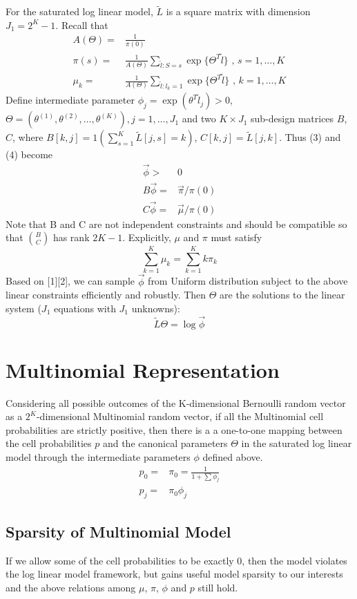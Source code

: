 \documentclass[11 pt, a4paper]{article}  %
\begin{document}
For the saturated log linear model, $\tilde{L}$ is a square matrix with dimension $J_1 = 2^K-1$. Recall that 
\begin{align}
A(\Theta) = & \frac{1}{\pi(0)} \nonumber \\
\pi(s) = & \frac{1}{A(\Theta)} \sum_{\tilde{l}:S=s}\exp \{ \Theta^T \tilde{l}\}  \text{ , } s = 1,\ldots, K \\
\mu_k = & \frac{1}{A(\Theta)} \sum_{\tilde{l}:l_k=1}\exp \{ \Theta^T \tilde{l}\}  \text{ , } k = 1, \ldots, K
\end{align}
Define intermediate parameter $\phi_j = \exp(\theta^T\tilde{l}_j) >0$, $\Theta = (\theta^{(1)},\theta^{(2)}, \ldots, \theta^{(K)}), j= 1, \ldots, J_1$ and two $K \times J_1$ sub-design matrices $B$, $C$, where $B[k,j] = 1(\sum_{s=1}^K\tilde{L}[j,s]=k)$, $C[k,j] = \tilde{L}[j,k]$. Thus (3) and (4) become
\begin{align}
\vec{\phi} > & 0\\
B \vec{\phi} = & \vec{\pi}/\pi(0)\\ 
C \vec{\phi} = & \vec{\mu}/\pi(0)
\end{align}
Note that B and C are not independent constraints and should be compatible so that $\binom{B}{C}$ has rank $2K-1$.
Explicitly, $\mu$ and $\pi$ must satisfy  
\[ \sum_{k=1}^K \mu_k = \sum_{k=1}^K k\pi_k\]
Based on [1][2], we can sample $\vec{\phi}$ from Uniform distribution subject to the above linear constraints efficiently and robustly. Then $\Theta$ are the solutions to the linear system ($J_1$ equations with $J_1$ unknowns):
\[\tilde{L}\Theta = \log \vec{\phi}\]


\section{Multinomial Representation}
Considering all possible outcomes of the K-dimensional Bernoulli random vector as a $2^K$-dimensional Multinomial random vector, if all the Multinomial cell probabilities are strictly positive, then there is a a one-to-one mapping between the cell probabilities $p$ and the canonical parameters $\Theta$ in the saturated log linear model through the intermediate parameters $\phi$ defined above.
\begin{align*}
p_0 = & \pi_0 = \frac{1}{1+\sum \phi_j}\\
p_j = & \pi_0 \phi_j
\end{align*}

\subsection{Sparsity of Multinomial Model}
If we allow some of the cell probabilities to be exactly 0, then the model violates the log linear model framework, but gains useful model sparsity to our interests and the above relations among $\mu$, $\pi$, $\phi$ and $p$ still hold.\\
\end{document}
